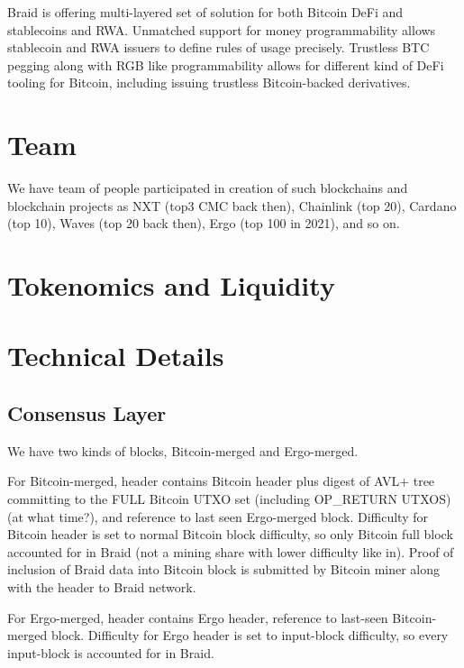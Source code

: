 \documentclass{llncs}   %
\newcommand{\authnote}[2]{\marginpar{\parbox{\marginparwidth}{\tiny %
  \textsf{#1 {\textcolor{blue}{notes: #2}}}}}%
  \textcolor{blue}{\textbf{\dag}}}
\newcommand{\authnote}[2]{
  \textsf{#1 \textcolor{blue}{: #2}}}
\newcommand{\authnote}[2]{}
\newcommand{\knote}[1]{{\authnote{\textcolor{green}{kushti notes}}{#1}}}
\newcommand{\bc}{Braid}
\begin{document}
\bc{} is offering multi-layered set of solution for both Bitcoin DeFi and stablecoins and RWA. Unmatched support for money programmability allows stablecoin and RWA issuers to define rules of usage precisely. Trustless BTC pegging along with RGB like programmability allows for different kind of DeFi tooling for Bitcoin, including issuing trustless Bitcoin-backed derivatives. 


\section{Team}
\label{sec-team}

We have team of people participated in creation of such blockchains and blockchain projects as NXT (top3 CMC back then), Chainlink (top 20),
 Cardano (top 10), Waves (top 20 back then), Ergo (top 100 in 2021), and so on.


\section{Tokenomics and Liquidity}
\label{sec-tokenomics}

\knote{to be decided later}



\section{Technical Details}
\label{sec-techdetails}

\subsection{Consensus Layer}

We have two kinds of blocks, Bitcoin-merged and Ergo-merged.

For Bitcoin-merged, header contains Bitcoin header plus digest of AVL+ tree committing to the FULL Bitcoin UTXO set (including OP\_RETURN UTXOS) (at what time?), and reference to last seen Ergo-merged block. Difficulty for Bitcoin header is set to normal Bitcoin block difficulty, so only Bitcoin full block accounted for in Braid (not a mining share with lower difficulty like in). Proof of inclusion of Braid data into Bitcoin block is submitted by Bitcoin miner along with the header to Braid network.

For Ergo-merged, header contains Ergo header, reference to last-seen Bitcoin-merged block. Difficulty for Ergo header is set to input-block difficulty, so every input-block is accounted for in Braid. 
\end{document}
